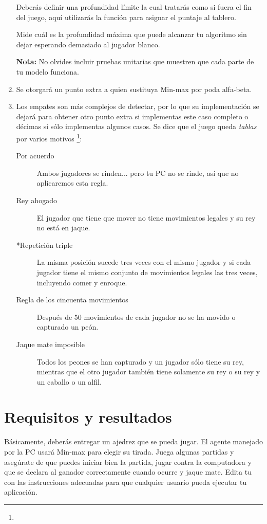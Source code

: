 \begin{enumerate}
 Deberás definir una profundidad límite la cual tratarás como si fuera el fin del juego, aquí utilizarás la función  para asignar el puntaje al tablero.

 Mide cuál es la profundidad máxima que puede alcanzar tu algoritmo sin dejar esperando demasiado al jugador blanco.

 \textbf{Nota:} No olvides incluir pruebas unitarias que muestren que cada parte de tu modelo funciona.

 \item Se otorgará un punto extra a quien sustituya Min-max por poda alfa-beta.

 \item Los empates son más complejos de detectar, por lo que su implementación se dejará para obtener otro punto extra si implementas este caso completo o décimas si sólo implementas algunos casos.  Se dice que el juego queda \emph{tablas} por varios motivos \footnote{}:
 \begin{description}
  \item [Por acuerdo]  Ambos jugadores se rinden... pero tu PC no se rinde, así que no aplicaremos esta regla.
  \item [Rey ahogado]  El jugador que tiene que mover no tiene movimientos legales y su rey no está en jaque.
  \item [*Repetición triple] La misma posición sucede tres veces con el mismo jugador y si cada jugador tiene el mismo conjunto de movimientos legales las tres veces, incluyendo comer y enroque.
  \item [Regla de los cincuenta movimientos] Después de 50 movimientos de cada jugador no se ha movido o capturado un peón.
  \item [Jaque mate imposible] Todos los peones se han capturado y un jugador sólo tiene su rey, mientras que el otro jugador también tiene solamente su rey o su rey y un caballo o un alfil.
 \end{description}

\end{enumerate}


\section{Requisitos y resultados}

Básicamente, deberás entregar un ajedrez que se pueda jugar.  El agente manejado por la PC usará Min-max para elegir su tirada.  Juega algunas partidas y asegúrate de que puedes iniciar bien la partida, jugar contra la computadora y que se declara al ganador correctamente cuando ocurre y jaque mate.  Edita tu  con las instrucciones adecuadas para que cualquier usuario pueda ejecutar tu aplicación.
